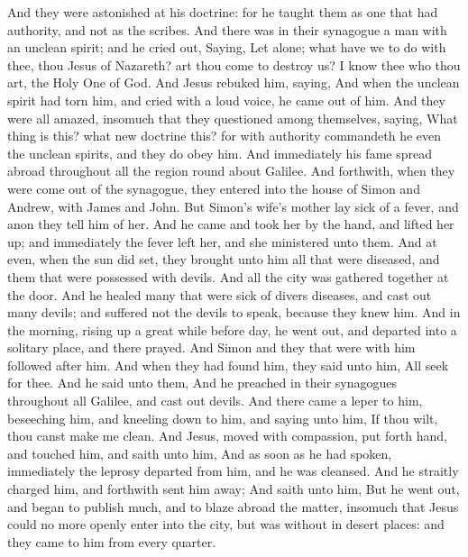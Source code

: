 {And they were
astonished
at
his
doctrine:
for
he
taught
them
as one that
had
authority,
and
not
as the
scribes.
And there
was
in
their
synagogue a
man
with an
unclean
spirit;
and he cried
out,
Saying,
Let
{}
alone; what
have we to
do
with
thee, thou
Jesus of
Nazareth? art thou
come to
destroy
us? I
know
thee
who thou
art, the Holy
One of
God.
And
Jesus
rebuked
him,
saying,
{}
And
when the
unclean
spirit had
torn
him,
and
cried with a
loud
voice, he came
out
of
him.
And they
were
all
amazed, insomuch
that they
questioned
among
themselves,
saying,
What thing
is
this?
what
new
doctrine
{}
this?
for
with
authority commandeth
he
even the
unclean
spirits,
and they do
obey
him.
And
immediately
his
fame spread
abroad
throughout
all the region round
about
Galilee.
And
forthwith, when they were come
out
of the
synagogue, they
entered
into the
house of
Simon
and
Andrew,
with
James
and
John.
But
Simon’s
wife’s mother
lay sick of a
fever,
and
anon they
tell
him
of
her.
And he
came and
took
her by the
hand, and
lifted
her
up;
and
immediately the
fever
left
her,
and she
ministered unto
them.
And at
even,
when the
sun
did
set, they
brought
unto
him
all that
were
diseased,
and
them that were possessed with
devils.
And
all the
city
was gathered
together
at the
door.
And he
healed
many that
were
sick of
divers
diseases,
and cast
out
many
devils;
and
suffered
not the
devils to
speak,
because they
knew
him.
And in the
morning, rising
up a great
while before
day, he went
out,
and
departed
into a
solitary
place, and
there
prayed.
And
Simon
and they that
were
with
him followed
after
him.
And when they had
found
him, they
said unto
him,
All
{} seek
for
thee.
And he
said unto
them,
{}
And
he
preached
in
their
synagogues
throughout
all
Galilee,
and cast
out
devils.
And there
came a
leper
to
him,
beseeching
him,
and kneeling
down to
him,
and
saying unto
him,
If thou
wilt, thou canst
make
me
clean.
And
Jesus, moved with
compassion, put
forth
{}
hand, and
touched
him,
and
saith unto
him,
{}
And as soon
as
he had
spoken,
immediately the
leprosy
departed
from
him,
and he was
cleansed.
And he straitly
charged
him,
and
forthwith
sent
him
away;
And
saith unto
him,
{}
But he went
out, and
began to
publish
{}
much,
and to blaze
abroad the
matter, insomuch
that
Jesus
could no
more
openly
enter
into the
city,
but
was
without
in
desert
places:
and they
came
to
him from every
quarter.

}
